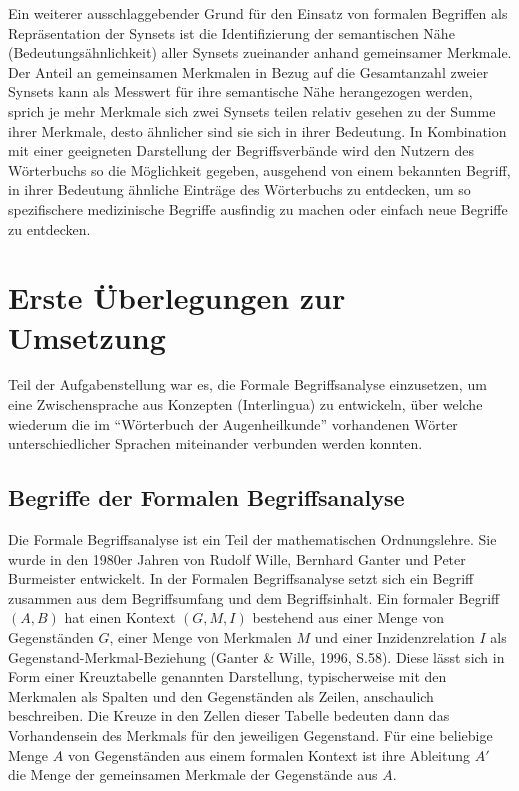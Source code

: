 \documentclass[pagesize,DIV=calc,12pt,final]{scrreprt}
\begin{document}
Ein weiterer ausschlaggebender Grund für den Einsatz von formalen Begriffen als Repräsentation der Synsets ist die Identifizierung der semantischen Nähe (Bedeutungsähnlichkeit) aller Synsets zueinander anhand gemeinsamer Merkmale. 
Der Anteil an gemeinsamen Merkmalen in Bezug auf die Gesamtanzahl zweier Synsets kann als Messwert für ihre semantische Nähe herangezogen werden, sprich je mehr Merkmale sich zwei Synsets teilen relativ gesehen zu der Summe ihrer Merkmale, desto ähnlicher sind sie sich in ihrer Bedeutung. 
In Kombination mit einer geeigneten Darstellung der Begriffsverbände wird den Nutzern des Wörterbuchs so die Möglichkeit gegeben, ausgehend von einem bekannten Begriff, in ihrer Bedeutung ähnliche Einträge des Wörterbuchs zu entdecken, um so spezifischere medizinische Begriffe ausfindig zu machen oder einfach neue Begriffe zu entdecken. 

\section{Erste Überlegungen zur Umsetzung}

Teil der Aufgabenstellung war es, die Formale Begriffsanalyse einzusetzen, um eine Zwischensprache aus Konzepten (Interlingua) zu entwickeln, über welche wiederum die im \enquote{Wörterbuch der Augenheilkunde} vorhandenen Wörter unterschiedlicher Sprachen miteinander verbunden werden konnten.

\subsection{Begriffe der Formalen Begriffsanalyse}
\label{subsec:fba}

Die Formale Begriffsanalyse ist ein Teil der mathematischen Ordnungslehre. 
Sie wurde in den 1980er Jahren von Rudolf Wille, Bernhard Ganter und Peter Burmeister entwickelt. 
In der Formalen Begriffsanalyse setzt sich ein Begriff zusammen aus dem Begriffsumfang und dem Begriffsinhalt. 
Ein formaler Begriff $(A,B)$ hat einen Kontext $(G,M,I)$ bestehend aus einer Menge von Gegenständen $G$, einer Menge von Merkmalen $M$ und einer Inzidenzrelation $I$ als Gegenstand-Merkmal-Beziehung (Ganter \& Wille, 1996, S.58). 
Diese lässt sich in Form einer Kreuztabelle genannten Darstellung, typischerweise mit den Merkmalen als Spalten und den Gegenständen als Zeilen, anschaulich beschreiben. 
Die Kreuze in den Zellen dieser Tabelle bedeuten dann das Vorhandensein des Merkmals für den jeweiligen Gegenstand. 
Für eine beliebige Menge $A$ von Gegenständen aus einem formalen Kontext ist ihre Ableitung $A'$ die Menge der gemeinsamen Merkmale der Gegenstände aus $A$. 
\end{document}
